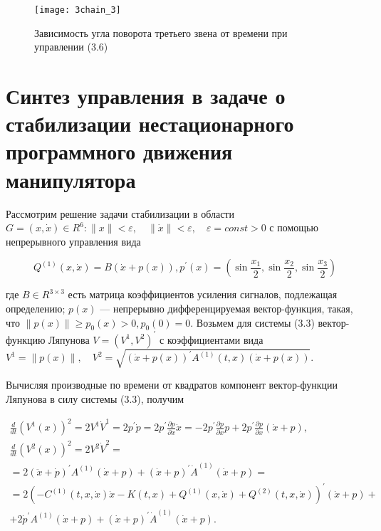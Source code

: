     \begin{figure}[h]
    	\centering
    	\texttt{[image: 3chain\_3]}
    	\caption{Зависимость угла поворота третьего звена от времени при управлении (3.6) }
    	\label{fig:manip33}
    \end{figure}
   
 
  \section{Синтез управления в задаче о стабилизации нестационарного программного движения манипулятора}%
 Рассмотрим решение задачи стабилизации в области $G = {(x, \dot x) \in R^6 : \|x\| < \varepsilon, \quad \|\dot x \| < \varepsilon, \quad \varepsilon = const>0}$
 с помощью непрерывного управления вида
 
 \begin{equation}
  Q^{(1)} (x, \dot x) = B(\dot x + p(x)),
  p^{'}(x) = (\sin \frac{x_1}{2}, \sin \frac{x_2}{2}, \sin \frac{x_3}{2})
 \end{equation}
 
 где $B \in R^{3 \times 3}$ есть матрица коэффициентов усиления сигналов, подлежащая определению; $p(x)$ --- непрерывно дифференцируемая вектор-функция, такая, что $\| p(x) \| \ge p_0(x) > 0, p_0(0) = 0$.
 Возьмем для системы (3.3) вектор-функцию Ляпунова $V = (V^1, V^2)^{'}$ с коэффициентами вида $V^1 = \|p(x)\|, \quad V^2 = \sqrt{(\dot x + p(x))^{'} A^{(1)} (t, x) (\dot x + p(x))}$.
 
 Вычисляя производные по времени от квадратов компонент вектор-функции Ляпунова  в силу системы (3.3), получим 
 
 \begin{equation*}
 \begin{array}{c}
 \displaystyle \frac{d}{dt} (V^1(x))^2 = 2 V^1 \dot V^1 = 2 p^{'} \dot p = 2 p^{'} \frac{\partial p }{\partial x} \dot x = -2 p^{'} \frac{\partial p }{\partial x} p + 2 p^{'} \frac{\partial p }{\partial x}(\dot x + p),\\
    \displaystyle \frac{d}{dt} (V^2(x))^2 = 2 V^2 \dot V^2 =\\
   \displaystyle = 2(\ddot x + \dot p)^{'} A^{(1)} (\dot x + p) + (\dot x + p)^{'} \dot A^{(1)} (\dot x + p) =\\
   \displaystyle = 2(- C^{(1)}(t, x, \dot x) \dot x - K(t, x) + Q^{(1)}(x, \dot x) + Q^{(2)}(t, x, \dot x))^{'} (\dot x + p) +\\
   \displaystyle + 2 \dot p^{'} A^{(1)} (\dot x + p) + (\dot x + p)^{'} \dot A^{(1)} (\dot x + p).
 \end{array}
 \end{equation*}
 
